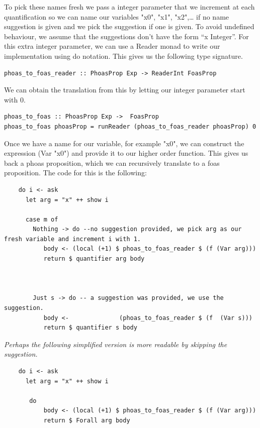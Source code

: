 To pick these names fresh we pass a integer parameter that we increment at each quantification so we can name our variables "x0", "x1", "x2",… if no name suggestion is given and we pick the suggestion if one is given. To avoid undefined behaviour, we assume that the suggestions don’t have the form “x Integer”. For this extra integer parameter, we can use a Reader monad to write our implementation using do notation. This gives us the following type signature.


\begin{verbatim}
phoas_to_foas_reader :: PhoasProp Exp -> ReaderInt FoasProp
\end{verbatim}


We can obtain the translation from this by letting our integer parameter start with 0.

\begin{verbatim}
phoas_to_foas :: PhoasProp Exp ->  FoasProp
phoas_to_foas phoasProp = runReader (phoas_to_foas_reader phoasProp) 0
\end{verbatim}

Once we have a name for our variable, for example "x0", we can construct the expression (Var "x0") and provide it to our higher order function. This gives us back a phoas proposition, which we can recursively translate to a foas proposition. The code for this is the following:

\begin{verbatim}
    do i <- ask
      let arg = "x" ++ show i
    
      case m of
        Nothing -> do --no suggestion provided, we pick arg as our fresh variable and increment i with 1.
           body <- (local (+1) $ phoas_to_foas_reader $ (f (Var arg)))
           return $ quantifier arg body
    
    
    
        Just s -> do -- a suggestion was provided, we use the suggestion.
           body <-              (phoas_to_foas_reader $ (f  (Var s)))
           return $ quantifier s body
\end{verbatim}

\textit{Perhaps the following simplified version is more readable by skipping the suggestion.}
\begin{verbatim}
    do i <- ask
      let arg = "x" ++ show i
    
       do 
           body <- (local (+1) $ phoas_to_foas_reader $ (f (Var arg)))
           return $ Forall arg body
\end{verbatim}

